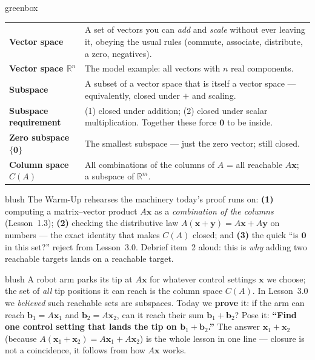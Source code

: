 \documentclass[10pt]{article}
\newcommand{\xx}{\mathbf{x}}
\newcommand{\yy}{\mathbf{y}}
\newcommand{\bb}{\mathbf{b}}
\newcommand{\zero}{\mathbf{0}}
\begin{document}
\begin{skillbox}{greenbox}
\renewcommand{\arraystretch}{1.3}
\begin{tabularx}{\linewidth}{@{}l X@{}}
\textbf{Vector space} & A set of vectors you can \emph{add} and \emph{scale} without ever leaving it, obeying the usual rules (commute, associate, distribute, a zero, negatives). \\
\textbf{Vector space $\mathbb{R}^n$} & The model example: all vectors with $n$ real components. \\
\textbf{Subspace} & A subset of a vector space that is itself a vector space --- equivalently, closed under $+$ and scaling. \\
\textbf{Subspace requirement} & (1) closed under addition; (2) closed under scalar multiplication. Together these force $\zero$ to be inside. \\
\textbf{Zero subspace $\{\zero\}$} & The smallest subspace --- just the zero vector; still closed. \\
\textbf{Column space $C(A)$} & All combinations of the columns of $A$ = all reachable $A\xx$; a subspace of $\mathbb{R}^m$. \\
\end{tabularx}
\end{skillbox}

\begin{fixedskillbox}{blush}
    The Warm-Up rehearses the machinery today's proof runs on:
    \textbf{(1)} computing a matrix--vector product $A\xx$ as a \emph{combination of the columns}
    (Lesson~1.3); \textbf{(2)} checking the distributive law $A(\xx+\yy)=A\xx+A\yy$ on numbers ---
    the exact identity that makes $C(A)$ closed; and \textbf{(3)} the quick ``is $\zero$ in this
    set?'' reject from Lesson~3.0. Debrief item~2 aloud: this is \emph{why} adding two reachable
    targets lands on a reachable target.
\end{fixedskillbox}

\begin{skillbox}[Hook]{blush}
    A robot arm parks its tip at $A\xx$ for whatever control settings $\xx$ we choose; the set of
    \emph{all} tip positions it can reach is the column space $C(A)$. In Lesson~3.0 we \emph{believed}
    such reachable sets are subspaces. Today we \textbf{prove} it: if the arm can reach $\bb_1=A\xx_1$
    and $\bb_2=A\xx_2$, can it reach their sum $\bb_1+\bb_2$? Pose it: \textbf{``Find one control
    setting that lands the tip on $\bb_1+\bb_2$.''} The answer $\xx_1+\xx_2$ (because
    $A(\xx_1+\xx_2)=A\xx_1+A\xx_2$) is the whole lesson in one line --- closure is not a coincidence,
    it follows from how $A\xx$ works.
\end{skillbox}
\end{document}
